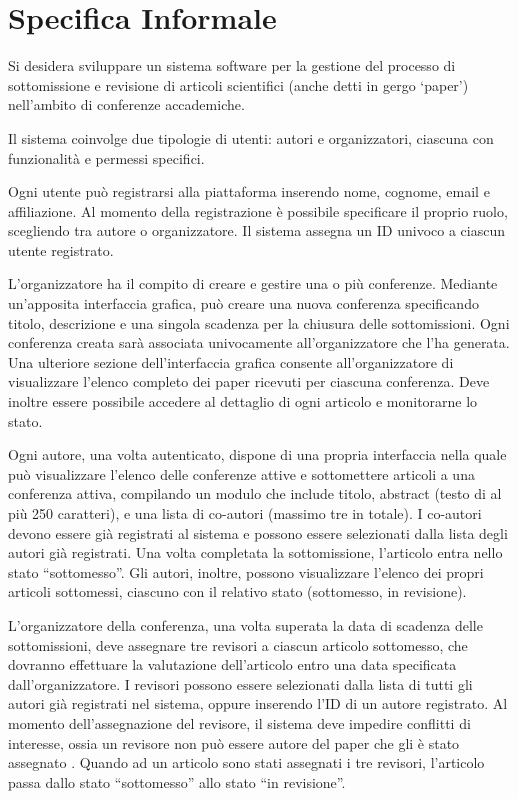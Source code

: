 \section{Specifica Informale}
\label{sec:informal}
Si desidera sviluppare un sistema software per la gestione del
processo di sottomissione e revisione di articoli scientifici (anche
detti in gergo ‘paper’) nell’ambito di conferenze accademiche.
\bigskip

Il sistema coinvolge due tipologie di utenti: autori e organizzatori,
ciascuna con funzionalità e permessi specifici.
\bigskip

Ogni utente può registrarsi alla piattaforma inserendo nome, cognome,
email e affiliazione. Al momento della registrazione è possibile
specificare il proprio ruolo, scegliendo tra autore o
organizzatore. Il sistema assegna un ID univoco a ciascun utente
registrato.
\bigskip

L’organizzatore ha il compito di creare e gestire una o più
conferenze. Mediante un’apposita interfaccia grafica, può creare una
nuova conferenza specificando titolo, descrizione e una singola
scadenza per la chiusura delle sottomissioni. Ogni conferenza creata
sarà associata univocamente all’organizzatore che l’ha generata. Una
ulteriore sezione dell’interfaccia grafica consente all’organizzatore
di visualizzare l’elenco completo dei paper ricevuti per ciascuna
conferenza. Deve inoltre essere possibile accedere al dettaglio di
ogni articolo e monitorarne lo stato.
\bigskip

Ogni autore, una volta autenticato, dispone di una propria interfaccia
nella quale può visualizzare l’elenco delle conferenze attive e
sottomettere articoli a una conferenza attiva, compilando un modulo
che include titolo, abstract (testo di al più 250 caratteri), e una
lista di co-autori (massimo tre in totale). I co-autori devono essere
già registrati al sistema e possono essere selezionati dalla lista
degli autori già registrati. Una volta completata la sottomissione,
l’articolo entra nello stato “sottomesso”. Gli autori, inoltre,
possono visualizzare l’elenco dei propri articoli sottomessi, ciascuno
con il relativo stato (sottomesso, in revisione).
\bigskip

L’organizzatore della conferenza, una volta superata la data di
scadenza delle sottomissioni, deve assegnare tre revisori a ciascun
articolo sottomesso, che dovranno effettuare la valutazione
dell’articolo entro una data specificata dall’organizzatore. I
revisori possono essere selezionati dalla lista di tutti gli autori
già registrati nel sistema, oppure inserendo l’ID di un autore
registrato. Al momento dell’assegnazione del revisore, il sistema deve
impedire conflitti di interesse, ossia un revisore non può essere
autore del paper che gli è stato assegnato . Quando ad un articolo
sono stati assegnati i tre revisori, l’articolo passa dallo stato
“sottomesso” allo stato “in revisione”.
\bigskip

